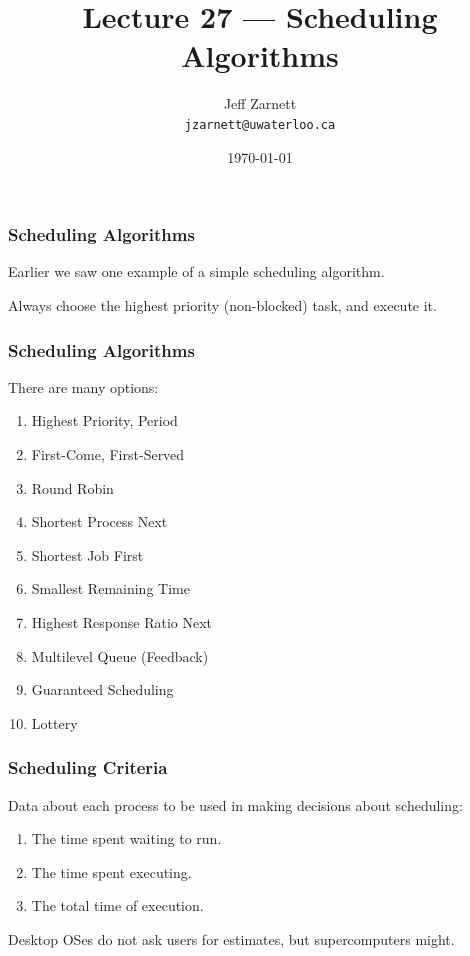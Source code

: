 

\title{Lecture 27 --- Scheduling Algorithms}

\author{Jeff Zarnett \\ \small \texttt{jzarnett@uwaterloo.ca}}
\date{\today}




\begin{frame}
  \titlepage

 \end{frame}



\begin{frame}
\frametitle{Scheduling Algorithms}

Earlier we saw one example of a simple scheduling algorithm. 

Always choose the highest priority (non-blocked) task, and execute it. 

 \end{frame}



\begin{frame}
\frametitle{Scheduling Algorithms}


There are many options:
\begin{enumerate}
	\item Highest Priority, Period
	\item First-Come, First-Served
	\item Round Robin
	\item Shortest Process Next
	\item Shortest Job First
	\item Smallest Remaining Time
	\item Highest Response Ratio Next
	\item Multilevel Queue (Feedback)
	\item Guaranteed Scheduling
	\item Lottery
\end{enumerate}


\end{frame}

\begin{frame}
\frametitle{Scheduling Criteria}

Data about each process to be used in making decisions about scheduling:

\begin{enumerate}
	\item The time spent waiting to run.
	\item The time spent executing.
	\item The total time of execution.
\end{enumerate}

Desktop OSes do not ask users for estimates, but supercomputers might.

\end{frame}

